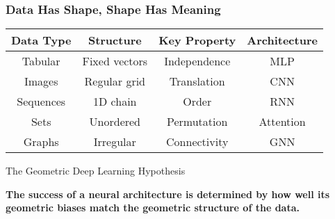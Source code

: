 \begin{frame}[fragile]\frametitle{Data Has Shape, Shape Has Meaning}

\begin{center}
\begin{tabular}{|c|c|c|c|}
\hline
\textbf{Data Type} & \textbf{Structure} & \textbf{Key Property} & \textbf{Architecture} \\
\hline
Tabular & Fixed vectors & Independence & MLP \\
Images & Regular grid & Translation & CNN \\
Sequences & 1D chain & Order & RNN \\
Sets & Unordered & Permutation & Attention \\
Graphs & Irregular & Connectivity & GNN \\
\hline
\end{tabular}
\end{center}

\vspace{0.5cm}

\begin{block}{The Geometric Deep Learning Hypothesis}
\begin{center}
\textbf{The success of a neural architecture is determined by how well its geometric biases match the geometric structure of the data.}
\end{center}
\end{block}

\end{frame}

